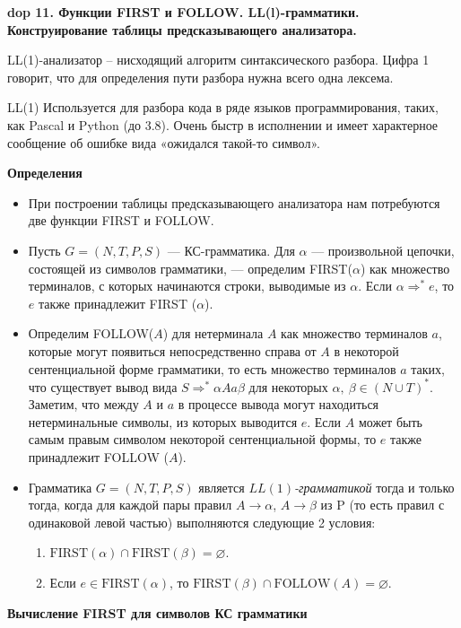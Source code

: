 \textbf{\LARGE dop 11. Функции FIRST и FOLLOW. LL(l)-грамматики. Конструирование таблицы предсказывающего анализатора.}

LL(1)-анализатор -- нисходящий алгоритм синтаксического разбора. Цифра 1 говорит, что для определения пути разбора нужна всего одна лексема.

LL(1) Используется для разбора кода в ряде языков программирования, таких, как Pascal и Python (до 3.8). Очень быстр в исполнении и имеет характерное сообщение об ошибке вида «ожидался такой-то символ».

\textbf{Определения}
\begin{itemize}
    \item При построении таблицы предсказывающего анализатора нам потребуются две функции FIRST и FOLLOW.
    \item Пусть $G = (N, T, P, S)$ --- КС-грамматика. 
    Для $\alpha$ --- произвольной цепочки, состоящей из символов грамматики, --- определим FIRST($\alpha$) как множество терминалов, с которых начинаются строки, выводимые из $\alpha$. 
    Если $\alpha \Rightarrow^\ast e$, то $e$ также принадлежит FIRST ($\alpha$).
    \item Определим FOLLOW($A$) для нетерминала $A$ как множество терминалов $a$, которые могут появиться непосредственно справа от $A$ в некоторой сентенциальной форме грамматики, то есть множество терминалов $a$ таких, что существует вывод вида $S \Rightarrow^\ast \alpha A a \beta$ для некоторых $\alpha,~\beta \in (N \cup T)^\ast$.
    Заметим, что между $A$ и $a$ в процессе вывода могут находиться нетерминальные символы, из которых выводится $e$. 
    Если $A$ может быть самым правым символом некоторой сентенциальной формы, то $e$ также принадлежит FOLLOW ($A$).
    \item Грамматика $G = (N, T, P, S)$ является \textit{$LL(1)$-грамматикой} тогда и только тогда, когда для каждой пары правил $A \rightarrow \alpha$, $A \rightarrow \beta$ из P (то есть правил с одинаковой левой частью) выполняются следующие 2 условия:
    \begin{enumerate}
        \item $\text{FIRST}(\alpha) \cap \text{FIRST}(\beta) = \varnothing$.
        \item Если $e \in \text{FIRST}(\alpha)$, то $\text{FIRST}(\beta) \cap \text{FOLLOW}(A) = \varnothing$.
    \end{enumerate}
\end{itemize}

\textbf{Вычисление FIRST для символов КС грамматики}


